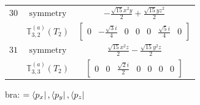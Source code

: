 \documentclass[fleqn,8pt,landscape]{jsarticle}
\begin{document}
\begin{longtable}{ccc}
$ 30 $ & $ \text{symmetry} $ & $ - \frac{\sqrt{15} x^{2} y}{2} + \frac{\sqrt{15} y z^{2}}{2} $ \\
$  $ & $ \mathbb{T}_{3,2}^{(a)}(T_{2}) $ & $ \begin{bmatrix} 0 & - \frac{\sqrt{3} i}{4} & 0 & 0 & 0 & \frac{\sqrt{5} i}{4} & 0 \end{bmatrix} $ \\ \hline
$ 31 $ & $ \text{symmetry} $ & $ \frac{\sqrt{15} x^{2} z}{2} - \frac{\sqrt{15} y^{2} z}{2} $ \\
$  $ & $ \mathbb{T}_{3,3}^{(a)}(T_{2}) $ & $ \begin{bmatrix} 0 & 0 & \frac{\sqrt{2} i}{2} & 0 & 0 & 0 & 0 \end{bmatrix} $ \\ \hline
\end{longtable}
bra: $=\bra{p_{x}}, \bra{p_{y}}, \bra{p_{z}}$
\end{document}
